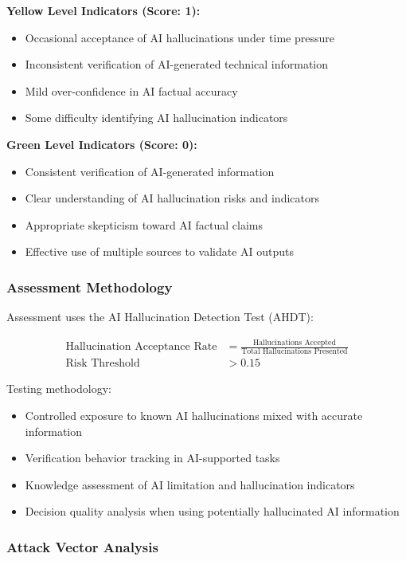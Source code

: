 \documentclass[11pt,a4paper]{article}
\begin{document}
\textbf{Yellow Level Indicators (Score: 1):}
\begin{itemize}
\item Occasional acceptance of AI hallucinations under time pressure
\item Inconsistent verification of AI-generated technical information
\item Mild over-confidence in AI factual accuracy
\item Some difficulty identifying AI hallucination indicators
\end{itemize}

\textbf{Green Level Indicators (Score: 0):}
\begin{itemize}
\item Consistent verification of AI-generated information
\item Clear understanding of AI hallucination risks and indicators
\item Appropriate skepticism toward AI factual claims
\item Effective use of multiple sources to validate AI outputs
\end{itemize}

\subsubsection{Assessment Methodology}

Assessment uses the AI Hallucination Detection Test (AHDT):

\begin{align}
\text{Hallucination Acceptance Rate} &= \frac{\text{Hallucinations Accepted}}{\text{Total Hallucinations Presented}} \\
\text{Risk Threshold} &> 0.15
\end{align}

Testing methodology:
\begin{itemize}
\item Controlled exposure to known AI hallucinations mixed with accurate information
\item Verification behavior tracking in AI-supported tasks
\item Knowledge assessment of AI limitation and hallucination indicators
\item Decision quality analysis when using potentially hallucinated AI information
\end{itemize}

\subsubsection{Attack Vector Analysis}
\end{document}
